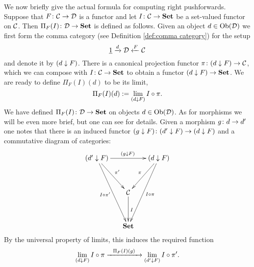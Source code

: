 \documentclass[CT4S-EN-RU]{subfiles}
\begin{document}
\begin{blockENG}
We now briefly give the actual formula for computing right pushforwards. Suppose that $F\colon\mathcal{C}\rightarrow\mathcal{D}$ is a functor and let $I\colon\mathcal{C}\rightarrow{\mathbf{Set}}$ be a set-valued functor on $\mathcal{C}$. Then $\Pi_F(I)\colon\mathcal{D}\rightarrow{\mathbf{Set}}$ is defined as follows. Given an object $d\in\textnormal{Ob}(\mathcal{D})$ we first form the comma category (see Definition \ref{def:comma category}) for the setup
$$\underline{1}\xrightarrow{d}\mathcal{D}\xleftarrow{F}\mathcal{C}$$
and denote it by $(d\downarrow F)$. There is a canonical projection functor $\pi\colon(d\downarrow F)\rightarrow\mathcal{C}$, which we can compose with $I\colon\mathcal{C}\rightarrow{\mathbf{Set}}$ to obtain a functor $(d\downarrow F)\rightarrow{\mathbf{Set}}$. We are ready to define $\Pi_F(I)(d)$ to be its limit,
$$\Pi_F(I)(d):=\lim_{(d\downarrow F)}I\circ\pi.$$
We have defined $\Pi_F(I)\colon\mathcal{D}\rightarrow{\mathbf{Set}}$ on objects $d\in\textnormal{Ob}(\mathcal{D})$. As for morphisms we will be even more brief, but one can see \cite{Sp1} for details. Given a morphism $g\colon d\rightarrow d'$ one notes that there is an induced functor $(g\downarrow F)\colon (d'\downarrow F)\rightarrow(d\downarrow F)$ and a commutative diagram of categories:
$$
\xymatrix@=15pt{
(d'\down F)\ar[rr]^{(g\down F)}\ar[ddr]^{\pi'}\ar[ddddr]_{I\circ\pi'}&&(d\down F)\ar[ddl]_{\pi}\ar[ddddl]^{I\circ\pi}\\\\
&\mcC\ar[dd]^I\\\\
&\Set
}
$$
By the universal property of limits, this induces the required function $$\lim_{(d\downarrow F)}I\circ\pi\xrightarrow{\ \ \Pi_F(I)(g)\ \ }\lim_{(d'\downarrow F)}I\circ\pi'.$$
\end{blockENG}

\begin{blockRUS}
\end{blockRUS}
\end{document}

